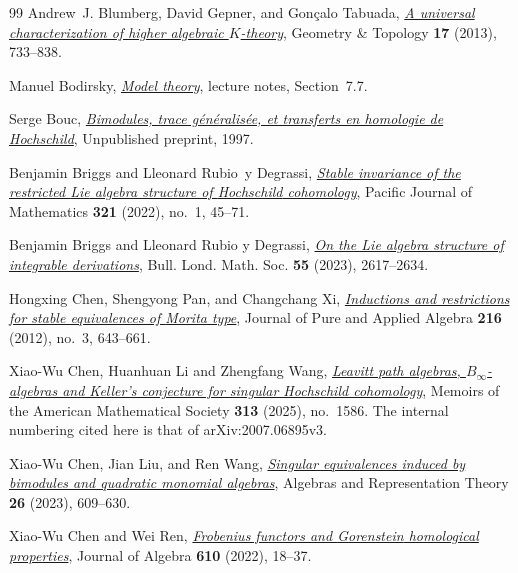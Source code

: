\documentclass[12pt,a4paper,english,reqno]{amsart}
\numberwithin{equation}{section}
\theoremstyle{plain}
\theoremstyle{definition}
\begin{document}
\begin{thebibliography}{99}
Andrew~J. Blumberg, David Gepner, and Gon{\c{c}}alo Tabuada,
  \emph{\href{https://doi.org/10.2140/gt.2013.17.733}{A universal
  characterization of higher algebraic {$K$}-theory}}, Geometry \& Topology
  \textbf{17} (2013), 733--838.

Manuel Bodirsky, \emph{\href{https://wwwpub.zih.tu-dresden.de/~bodirsky/Model-theory.pdf}{Model theory}},
  lecture notes, Section~7.7.

Serge Bouc, \emph{\href{https://www.lamfa.u-picardie.fr/bouc/}{Bimodules, trace
  g\'en\'eralis\'ee, et transferts en homologie de {Hochschild}}}, Unpublished
  preprint, 1997.

Benjamin Briggs and Lleonard Rubio~y Degrassi,
  \emph{\href{https://doi.org/10.2140/pjm.2022.321.45}{Stable invariance of the
  restricted {Lie} algebra structure of {Hochschild} cohomology}}, Pacific
  Journal of Mathematics \textbf{321} (2022), no.~1, 45--71.

Benjamin Briggs and Lleonard Rubio y Degrassi,
  \emph{\href{https://doi.org/10.1112/blms.12884}{On the Lie algebra structure
  of integrable derivations}}, Bull. Lond. Math. Soc. \textbf{55}
  (2023), 2617--2634.

Hongxing Chen, Shengyong Pan, and Changchang Xi,
  \emph{\href{https://doi.org/10.1016/j.jpaa.2011.07.016}{Inductions and
  restrictions for stable equivalences of {Morita} type}}, Journal of Pure and
  Applied Algebra \textbf{216} (2012), no.~3, 643--661.

Xiao-Wu Chen, Huanhuan Li and Zhengfang Wang,
  \emph{\href{https://doi.org/10.1090/memo/1586}{Leavitt path algebras,
  $B_\infty$-algebras and Keller's conjecture for singular Hochschild
  cohomology}}, Memoirs of the American Mathematical Society
  \textbf{313} (2025), no.~1586.
  The internal numbering cited here is that of arXiv:2007.06895v3.

Xiao-Wu Chen, Jian Liu, and Ren Wang,
  \emph{\href{https://doi.org/10.1007/s10468-021-10104-3}{Singular equivalences
  induced by bimodules and quadratic monomial algebras}}, Algebras and
  Representation Theory \textbf{26} (2023), 609--630.

Xiao-Wu Chen and Wei Ren,
  \emph{\href{https://doi.org/10.1016/j.jalgebra.2022.06.030}{Frobenius
  functors and {Gorenstein} homological properties}}, Journal of Algebra
  \textbf{610} (2022), 18--37.


\end{thebibliography}
\end{document}
